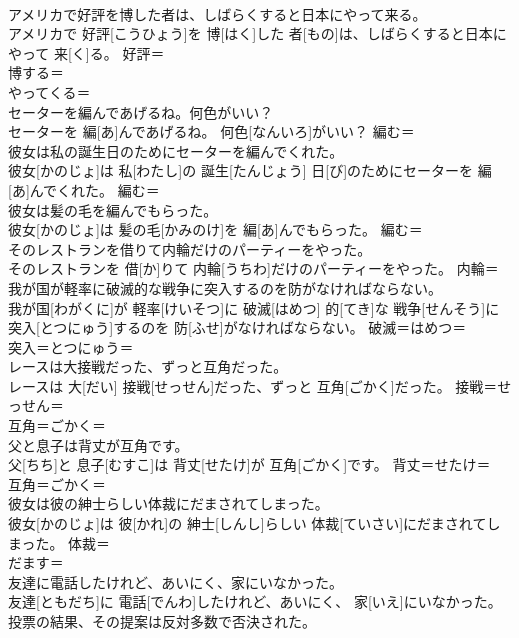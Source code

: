 \documentclass[8pt]{extreport}
\begin{document}
\begin{CJK}{UTF8}{min}
\\	アメリカで好評を博した者は、しばらくすると日本にやって来る。	
\\	アメリカで 好評[こうひょう]を 博[はく]した 者[もの]は、しばらくすると日本にやって 来[く]る。	好評＝ 
\\	博する＝ 
\\	やってくる＝ 
\\	セーターを編んであげるね。何色がいい？	
\\	セーターを 編[あ]んであげるね。 何色[なんいろ]がいい？	編む＝ 
\\	彼女は私の誕生日のためにセーターを編んでくれた。	
\\	彼女[かのじょ]は 私[わたし]の 誕生[たんじょう] 日[び]のためにセーターを 編[あ]んでくれた。	編む＝ 
\\	彼女は髪の毛を編んでもらった。	
\\	彼女[かのじょ]は 髪の毛[かみのけ]を 編[あ]んでもらった。	編む＝ 
\\	そのレストランを借りて内輪だけのパーティーをやった。	
\\	そのレストランを 借[か]りて 内輪[うちわ]だけのパーティーをやった。	内輪＝ 
\\	我が国が軽率に破滅的な戦争に突入するのを防がなければならない。	
\\	我が国[わがくに]が 軽率[けいそつ]に 破滅[はめつ] 的[てき]な 戦争[せんそう]に 突入[とつにゅう]するのを 防[ふせ]がなければならない。	破滅＝はめつ＝ 
\\	突入＝とつにゅう＝ 
\\	レースは大接戦だった、ずっと互角だった。	
\\	レースは 大[だい] 接戦[せっせん]だった、ずっと 互角[ごかく]だった。	接戦＝せっせん＝ 
\\	互角＝ごかく＝ 
\\	父と息子は背丈が互角です。	
\\	父[ちち]と 息子[むすこ]は 背丈[せたけ]が 互角[ごかく]です。	背丈＝せたけ＝ 
\\	互角＝ごかく＝ 
\\	彼女は彼の紳士らしい体裁にだまされてしまった。	
\\	彼女[かのじょ]は 彼[かれ]の 紳士[しんし]らしい 体裁[ていさい]にだまされてしまった。	体裁＝ 
\\	だます＝ 
\\	友達に電話したけれど、あいにく、家にいなかった。	
\\	友達[ともだち]に 電話[でんわ]したけれど、あいにく、 家[いえ]にいなかった。	
\\	投票の結果、その提案は反対多数で否決された。	

\end{CJK}
\end{document}
